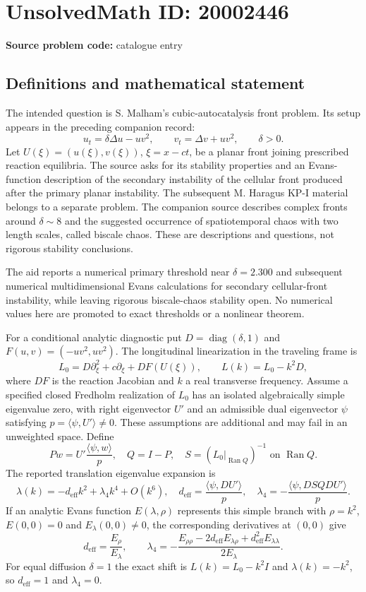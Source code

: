 \documentclass[11pt]{article}
\begin{document}
\section*{UnsolvedMath ID: 20002446}
\textbf{Source problem code:} catalogue entry
\subsection{Definitions and mathematical statement}
The intended question is S. Malham's cubic-autocatalysis front problem. Its setup appears in the preceding companion record:
\[
 u_t=\delta\Delta u-uv^2,\qquad
 v_t=\Delta v+uv^2,\qquad\delta>0.
\]
Let $U(\xi)=(u(\xi),v(\xi))$, $\xi=x-ct$, be a planar front joining prescribed reaction equilibria. The source asks for its stability properties and an Evans-function description of the secondary instability of the cellular front produced after the primary planar instability. The subsequent M. Haragus KP-I material belongs to a separate problem. The companion source describes complex fronts around $\delta\sim8$ and the suggested occurrence of spatiotemporal chaos with two length scales, called biscale chaos. These are descriptions and questions, not rigorous stability conclusions.

The aid reports a numerical primary threshold near $\delta=2.300$ and subsequent numerical multidimensional Evans calculations for secondary cellular-front instability, while leaving rigorous biscale-chaos stability open. No numerical values here are promoted to exact thresholds or a nonlinear theorem.

For a conditional analytic diagnostic put $D=\operatorname{diag}(\delta,1)$ and $F(u,v)=(-uv^2,uv^2)$. The longitudinal linearization in the traveling frame is
\[
 L_0=D\partial_\xi^2+c\partial_\xi+DF(U(\xi)),
 \qquad L(k)=L_0-k^2D,
\]
where $DF$ is the reaction Jacobian and $k$ a real transverse frequency. Assume a specified closed Fredholm realization of $L_0$ has an isolated algebraically simple eigenvalue zero, with right eigenvector $U'$ and an admissible dual eigenvector $\psi$ satisfying $p=\langle\psi,U'\rangle\ne0$. These assumptions are additional and may fail in an unweighted space. Define
\[
 P w=U'\frac{\langle\psi,w\rangle}{p},\quad Q=I-P,
 \quad S=(L_0|_{\operatorname{Ran}Q})^{-1}
 \text{ on }\operatorname{Ran}Q.
\]
The reported translation eigenvalue expansion is
\[
 \lambda(k)=-d_{\mathrm{eff}}k^2+\lambda_4k^4+O(k^6),
 \quad d_{\mathrm{eff}}=\frac{\langle\psi,DU'\rangle}{p},
 \quad\lambda_4=-\frac{\langle\psi,DSQDU'\rangle}{p}.
\]
If an analytic Evans function $E(\lambda,\rho)$ represents this simple branch with $\rho=k^2$, $E(0,0)=0$ and $E_\lambda(0,0)\ne0$, the corresponding derivatives at $(0,0)$ give
\[
 d_{\mathrm{eff}}=\frac{E_\rho}{E_\lambda},\qquad
 \lambda_4=-\frac{E_{\rho\rho}-2d_{\mathrm{eff}}E_{\lambda\rho}
                  +d_{\mathrm{eff}}^2E_{\lambda\lambda}}
                    {2E_\lambda}.
\]
For equal diffusion $\delta=1$ the exact shift is $L(k)=L_0-k^2I$ and $\lambda(k)=-k^2$, so $d_{\mathrm{eff}}=1$ and $\lambda_4=0$.
\end{document}
